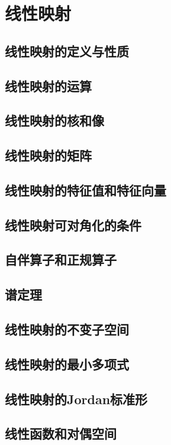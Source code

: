 \documentclass[12pt, a4paper, oneside, UTF8]{ctexbook}
\begin{document}
% 
\else
\fi
\chapter{线性映射}
	\section{线性映射的定义与性质}
	\section{线性映射的运算}
	\section{线性映射的核和像}
	\section{线性映射的矩阵}
	\section{线性映射的特征值和特征向量}
	\section{线性映射可对角化的条件}
	\section{自伴算子和正规算子}
	\section{谱定理}
	\section{线性映射的不变子空间}
	\section{线性映射的最小多项式}
	\section{线性映射的Jordan标准形}
	\section{线性函数和对偶空间}
\ifx\allfiles\undefined
\end{document}
